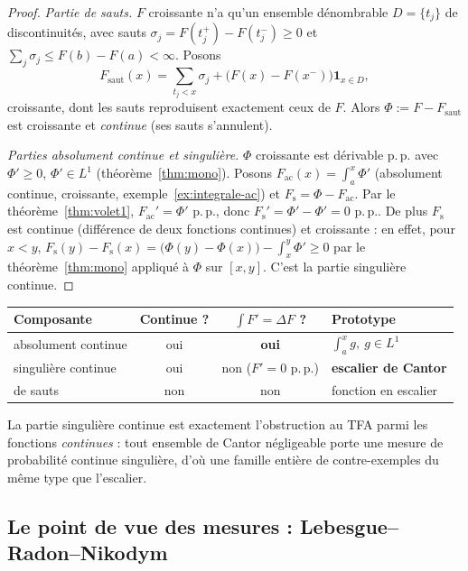 \documentclass[11pt]{article}
\theoremstyle{thmblue}
\theoremstyle{defplain}
\theoremstyle{rem}
\newcommand{\pp}{p.\,p.}
\begin{document}
\begin{proof}
\emph{Partie de sauts.} $F$ croissante n'a qu'un ensemble dénombrable $D=\{t_j\}$ de discontinuités,
avec sauts $\sigma_j=F(t_j^+)-F(t_j^-)\ge0$ et $\sum_j\sigma_j\le F(b)-F(a)<\infty$. Posons
\[
F_{\mathrm{saut}}(x)=\sum_{t_j<x}\sigma_j+\bigl(F(x)-F(x^-)\bigr)\mathbf 1_{x\in D},
\]
croissante, dont les sauts reproduisent exactement ceux de $F$. Alors $\Phi:=F-F_{\mathrm{saut}}$ est
croissante et \emph{continue} (ses sauts s'annulent).

\emph{Parties absolument continue et singulière.} $\Phi$ croissante est dérivable \pp{} avec
$\Phi'\ge0$, $\Phi'\in L^1$ (théorème~\ref{thm:mono}). Posons
$F_{\mathrm{ac}}(x)=\int_a^x\Phi'$ (absolument continue, croissante, exemple~\ref{ex:integrale-ac})
et $F_{\mathrm{s}}=\Phi-F_{\mathrm{ac}}$. Par le théorème~\ref{thm:volet1}, $F_{\mathrm{ac}}'=\Phi'$
\pp, donc $F_{\mathrm{s}}'=\Phi'-\Phi'=0$ \pp. De plus $F_{\mathrm{s}}$ est continue (différence de
deux fonctions continues) et croissante : en effet, pour $x<y$,
$F_{\mathrm s}(y)-F_{\mathrm s}(x)=\bigl(\Phi(y)-\Phi(x)\bigr)-\int_x^y\Phi'\ge0$ par le
théorème~\ref{thm:mono} appliqué à $\Phi$ sur $[x,y]$. C'est la partie singulière continue.
\end{proof}

\begin{center}
\renewcommand{\arraystretch}{1.35}
\begin{tabular}{@{}>{\raggedright}p{3.4cm} c c >{\raggedright\arraybackslash}p{4.6cm}@{}}
\toprule
\textbf{Composante} & \textbf{Continue ?} & $\displaystyle\int F'=\Delta F$ ? & \textbf{Prototype} \\
\midrule
absolument continue & oui & \textbf{oui} & $\int_a^x g,\ g\in L^1$ \\
singulière continue & oui & non ($F'=0$ \pp) & \textbf{escalier de Cantor} \\
de sauts & non & non & fonction en escalier \\
\bottomrule
\end{tabular}
\end{center}

\noindent
La partie singulière continue est exactement l'obstruction au TFA parmi les fonctions \emph{continues} :
tout ensemble de Cantor négligeable porte une mesure de probabilité continue singulière, d'où une
famille entière de contre-exemples du même type que l'escalier.

\subsection{Le point de vue des mesures : Lebesgue--Radon--Nikodym}\label{sub:lrn}
\end{document}
